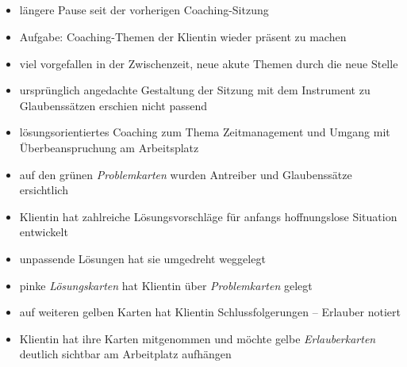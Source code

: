 \documentclass[11pt,a4paper]{article}
\begin{document}
\subsection*{\color{Orange}{Vierte Sitzung: Lösungsorientiertes Coaching}}


\begin{itemize}

	
	\item längere Pause seit der vorherigen Coaching-Sitzung
	
	\item Aufgabe: Coaching-Themen der Klientin wieder präsent zu machen
	
	\item viel vorgefallen in der Zwischenzeit, neue akute Themen durch die neue Stelle
	
	\item ursprünglich angedachte Gestaltung der Sitzung mit dem Instrument zu Glaubenssätzen erschien nicht passend
	
	\item lösungsorientiertes Coaching zum Thema Zeitmanagement und Umgang mit Überbeanspruchung am Arbeitsplatz
	
	\item auf den grünen \textsl{Problemkarten} wurden Antreiber und Glaubenssätze ersichtlich
	
	\item Klientin hat zahlreiche Lösungsvorschläge für anfangs hoffnungslose Situation entwickelt
	
	\item unpassende Lösungen hat sie umgedreht weggelegt	
	
	\item pinke \textsl{Lösungskarten} hat Klientin über \textsl{Problemkarten} gelegt
	
	\item auf weiteren gelben Karten hat Klientin Schlussfolgerungen -- Erlauber notiert
	
	\item Klientin hat ihre Karten mitgenommen und möchte gelbe \textsl{Erlauberkarten} deutlich sichtbar am Arbeitplatz aufhängen


\end{itemize}
\end{document}
